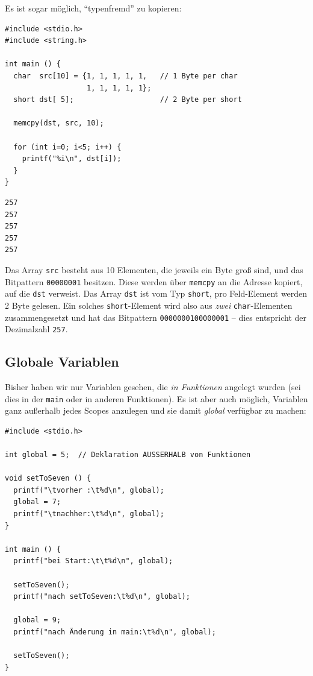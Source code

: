 Es ist sogar möglich, \enquote{typenfremd} zu kopieren:

\begin{codebox}
\begin{verbatim}
#include <stdio.h>
#include <string.h>

int main () {
  char  src[10] = {1, 1, 1, 1, 1,   // 1 Byte per char
                   1, 1, 1, 1, 1};
  short dst[ 5];                    // 2 Byte per short
  
  memcpy(dst, src, 10);
  
  for (int i=0; i<5; i++) {
    printf("%i\n", dst[i]);
  }
}
\end{verbatim}
\end{codebox}

\begin{cmdbox}
\begin{verbatim}
257
257
257
257
257
\end{verbatim}
\end{cmdbox}

Das Array \texttt{src} besteht aus 10 Elementen, die jeweils ein Byte groß sind, und das Bitpattern \texttt{00000001} besitzen. Diese werden über \texttt{memcpy} an die Adresse kopiert, auf die \texttt{dst} verweist. Das Array \texttt{dst} ist vom Typ \texttt{short}, \ie pro Feld-Element werden 2 Byte gelesen. Ein solches \texttt{short}-Element wird also aus \emph{zwei} \texttt{char}-Elementen zusammengesetzt und hat das Bitpattern \texttt{0000000100000001} -- dies entspricht der Dezimalzahl \texttt{257}.

\subsection{Globale Variablen} \label{sec:globals}
Bisher haben wir nur Variablen gesehen, die \emph{in Funktionen} angelegt wurden (sei dies in der \texttt{main} oder in anderen Funktionen). Es ist aber auch möglich, Variablen ganz außerhalb jedes Scopes anzulegen und sie damit \emph{global} verfügbar zu machen:

\begin{codebox}
\begin{verbatim}
#include <stdio.h>

int global = 5;  // Deklaration AUSSERHALB von Funktionen

void setToSeven () {
  printf("\tvorher :\t%d\n", global);
  global = 7;
  printf("\tnachher:\t%d\n", global);
}

int main () {
  printf("bei Start:\t\t%d\n", global);
  
  setToSeven();
  printf("nach setToSeven:\t%d\n", global);
  
  global = 9;
  printf("nach Änderung in main:\t%d\n", global);
  
  setToSeven();
}
\end{verbatim}
\end{codebox}

